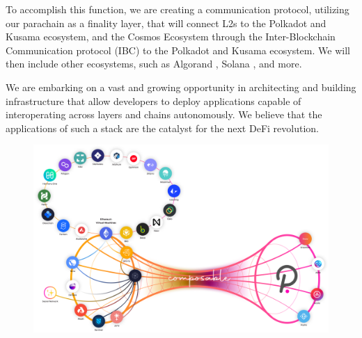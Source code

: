 To accomplish this function, we are creating a communication protocol, utilizing our parachain as a finality layer, that will connect L2s to the Polkadot and Kusama ecosystem, and the Cosmos Ecosystem \cite{Cosmos:Blockchains} through the Inter-Blockchain Communication protocol (IBC) \cite{Inter-BlockchainCommunication} to the Polkadot and Kusama ecosystem.
%
We will then include other ecosystems, such as Algorand \cite{AlgorandAlgorand}, Solana \cite{ScalableScale}, and more.

We are embarking on a vast and growing opportunity in architecting and building infrastructure that allow developers to deploy applications capable of interoperating across layers and chains autonomously.
%
We believe that the applications of such a stack are the catalyst for the next DeFi revolution.

\begin{figure}
    \centering
    \includegraphics[scale=0.28]{images/parachain.png}
\end{figure}
